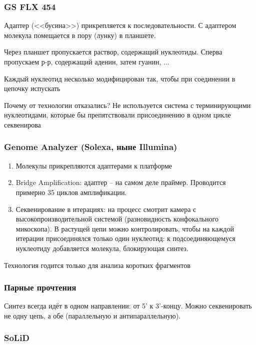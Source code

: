 \documentclass[main.tex]{subfiles}
\begin{document}
\subsubsection{GS FLX 454}

Адаптер (<<бусина>>) прикрепляется к последовательности.
С адаптером молекула помещается в пору (лунку) в планшете.

Через планшет пропускается раствор, содержащий нуклеотиды.
Сперва пропускаем р-р, содержащий аденин, затем гуанин, ...

Каждый нуклеотид несколько модифицирован так, чтобы при соединении в цепочку испускать

Почему от технологии отказались?
Не используется система с терминирующими нуклеотидами, которые бы препятствовали присоединению в одном цикле секвенирова

\subsubsection{Genome Analyzer (Solexa, ныне Illumina)}

\begin{enumerate}[noitemsep]
    \item Молекулы прикрепляются адаптерами к платформе
    \item Bridge Amplification: адаптер -- на самом деле праймер.
    Проводится примерно 35 циклов амплификации.
    \item Секвенирование в итерациях: на процесс смотрит камера с высокопроизводительной системой (разновидность конфокального микоскопа).
    В растущей цепи можно контролировать, чтобы на каждой итерации присоединялся только один нуклеотид: к подсоединяющемуся нуклеотиду добавляется молекула, блокирующая синтез.
\end{enumerate}

Технология годится только для анализа коротких фрагментов %

\subsubsection{Парные прочтения}

Синтез всегда идёт в одном направлении: от 5' к 3'-концу.
Можно секвенировать не одну цепь, а обе (параллельную и антипараллельную).

\subsubsection{SoLiD}
\end{document}
